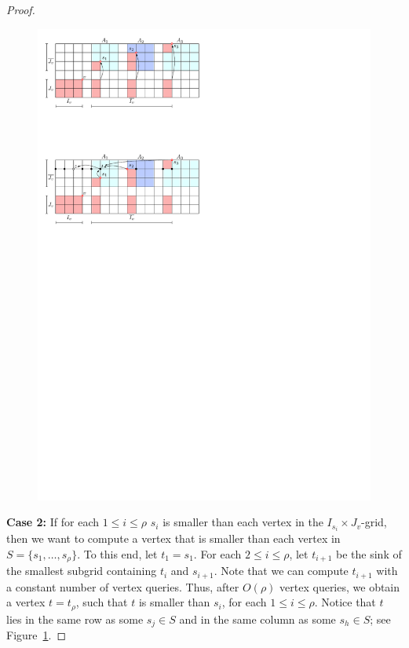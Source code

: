 \documentclass[a4paper,10pt]{article}
\begin{document}
\begin{proof}
\begin{figure}[h]
\centering
\includegraphics{expansion_lemma_fig2.pdf}
\caption{\small }
\label{fig:Expansion Case 2}
\end{figure}

\textbf{Case 2:} If for each $1\leq i\leq \rho$ $s_i$ is smaller than each vertex in the $I_{s_i}\times J_v$-grid, then we want to compute a vertex that is smaller than each vertex in $S = \{s_1, \ldots, s_\rho\}$.
To this end, let $t_1 = s_1$.
For each $2\leq i\leq \rho$, let $t_{i+1}$ be the sink of the smallest subgrid containing $t_i$ and $s_{i+1}$. Note that we can compute $t_{i+1}$ with a constant number of vertex queries.
Thus, after $O(\rho)$ vertex queries, we obtain a vertex $t = t_\rho$, such that $t$ is smaller than $s_i$, for each $1\leq i\leq \rho$. Notice that $t$ lies in the same row as some $s_j\in S$ and in the same column as some $s_h\in S$; see Figure~\ref{fig:Expansion Case 2}. 


\end{proof}
\end{document}
